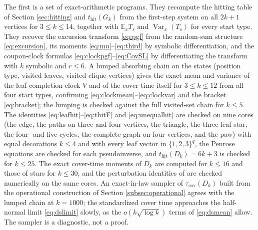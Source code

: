 \documentclass[11pt]{amsart}
\theoremstyle{remark}
\numberwithin{equation}{section}
\DeclareMathOperator{\Var}{Var}
\newcommand{\E}{\mathbb{E}}
\newcommand{\thit}{t_{\mathrm{hit}}}
\newcommand{\taucov}{\tau_{\mathrm{cov}}}
\begin{document}
The first is a set of exact-arithmetic programs. They recompute the hitting table of Section \ref{sec:hitting} and $\thit(G_k)$ from the first-step system on all $2k+1$ vertices for $3\le k\le 14$, together with $\E_xT_s$ and $\Var_x(T_s)$ for every start type. They recover the excursion transform \eqref{eq:pgf} from the random-sum structure \eqref{eq:excursion}, its moments \eqref{eq:mu}--\eqref{eq:third} by symbolic differentiation, and the coupon-clock formulas \eqref{eq:clockpgf}--\eqref{eq:CovSL} by differentiating the transform with $k$ symbolic and $r\le 6$. A lumped absorbing chain on the states (position type, visited leaves, visited clique vertices) gives the exact mean and variance of the leaf-completion clock $V$ and of the cover time itself for $3\le k\le 12$ from all four start types, confirming \eqref{eq:clockmean}--\eqref{eq:clockvar} and the bracket \eqref{eq:bracket}; the lumping is checked against the full visited-set chain for $k\le 5$. The identities \eqref{eq:leafhit}--\eqref{eq:thitF} and \eqref{eq:unequalhit} are checked on nine cores (the edge, the paths on three and four vertices, the triangle, the three-leaf star, the four- and five-cycles, the complete graph on four vertices, and the paw) with equal decorations $k\le 4$ and with every leaf vector in $\{1,2,3\}^{q}$, the Penrose equations are checked for each pseudoinverse, and $\thit(D_k)=6k+3$ is checked for $k\le 25$. The exact cover-time moments of $D_k$ are computed for $k\le 16$ and those of stars for $k\le 30$, and the perturbation identities of  are checked numerically on the same cores. An exact-in-law sampler of $\taucov(D_k)$ built from the operational construction of Section \ref{subsec:operational} agrees with the lumped chain at $k=1000$; the standardized cover time approaches the half-normal limit \eqref{eq:dslimit} slowly, as the $o(k\sqrt{\log k})$ terms of \eqref{eq:dsmean} allow. The sampler is a diagnostic, not a proof.
\end{document}
